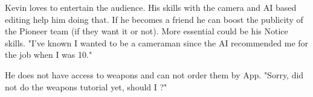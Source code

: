 \begin{npcBox}[title=Kevin\, Camera]
    \begin{consequences}
    \item {}
    \item {}
    \item {}
    \end{consequences}

    \begin{npcDescription}
    Kevin loves to entertain the audience. His skills with the camera and AI based editing help him doing that. If he becomes a friend he can boost the publicity of the Pioneer team (if they want it or not). More essential could be his Notice skills.
    "I've known I wanted to be a cameraman since the AI recommended me for the job when I was 10."


    He does not have access to weapons and can not order them by App. "Sorry, did not do the weapons tutorial yet, should I ?"

    \end{npcDescription}

\end{npcBox}



